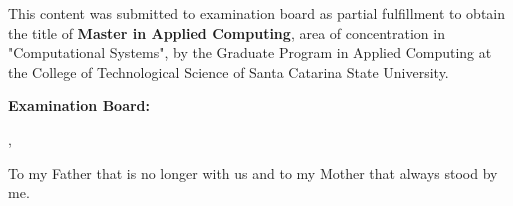 % 
\begin{folhadeaprovacao}

  \begin{center}
    {\ABNTEXchapterfont\bfseries\imprimirautor}
    \vspace{6em}

      \ABNTEXchapterfont\bfseries\imprimirtitulo

  \end{center}
    \vspace{1em}
    {\justify
    This content was submitted to examination board as partial fulfillment to obtain the title of
      {\ABNTEXchapterfont\bfseries Master in Applied Computing},
      area of concentration in "Computational Systems", by the Graduate Program in Applied Computing at the College of Technological Science of Santa Catarina State University.}


  \vspace{3em}
  \noindent
  {\bfseries Examination Board:}

    \vspace*{\fill}
    \begin{center}
      \imprimirlocal,\,\imprimirfulldata
    \end{center}
\end{folhadeaprovacao}

\begin{dedicatoria}
  To my Father that is no longer with us and to my Mother that always stood by me.
\end{dedicatoria}

